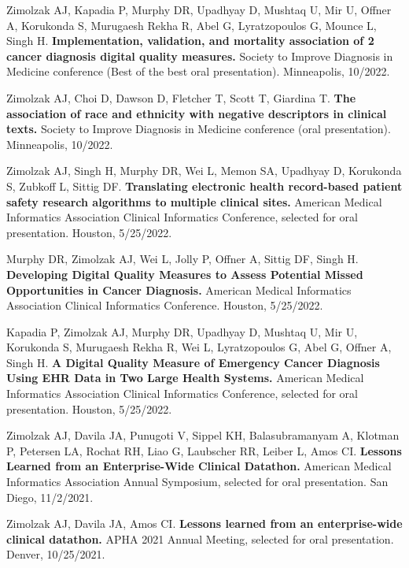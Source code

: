 \documentclass[10pt]{article}
\begin{document}
Zimolzak AJ, Kapadia P, Murphy DR, Upadhyay D, Mushtaq U, Mir U,
Offner A, Korukonda S, Murugaesh Rekha R, Abel G, Lyratzopoulos G,
Mounce L, Singh H. \textbf{Implementation, validation, and mortality
  association of 2 cancer diagnosis digital quality measures.} Society
to Improve Diagnosis in Medicine conference (Best of the best oral
presentation). Minneapolis, 10/2022.

Zimolzak AJ, Choi D, Dawson D, Fletcher T, Scott T, Giardina T.
\textbf{The association of race and ethnicity with negative
  descriptors in clinical texts.} Society to Improve Diagnosis in
Medicine conference (oral presentation). Minneapolis, 10/2022.



Zimolzak AJ, Singh H, Murphy DR, Wei L, Memon SA, Upadhyay D,
Korukonda S, Zubkoff L, Sittig DF. \textbf{Translating electronic
  health record-based patient safety research algorithms to multiple
  clinical sites.} American Medical Informatics Association Clinical
Informatics Conference, selected for oral presentation. Houston,
5/25/2022.

Murphy DR, Zimolzak AJ, Wei L, Jolly P, Offner A, Sittig DF, Singh H.
\textbf{Developing Digital Quality Measures to Assess Potential Missed
  Opportunities in Cancer Diagnosis.} American Medical Informatics
Association Clinical Informatics Conference. Houston, 5/25/2022.

Kapadia P, Zimolzak AJ, Murphy DR, Upadhyay D, Mushtaq U, Mir U,
Korukonda S, Murugaesh Rekha R, Wei L, Lyratzopoulos G, Abel G, Offner
A, Singh H. \textbf{A Digital Quality Measure of Emergency Cancer
  Diagnosis Using EHR Data in Two Large Health Systems.} American
Medical Informatics Association Clinical Informatics Conference,
selected for oral presentation. Houston, 5/25/2022.



Zimolzak AJ, Davila JA, Punugoti V, Sippel KH, Balasubramanyam A,
Klotman P, Petersen LA, Rochat RH, Liao G, Laubscher RR, Leiber L,
Amos CI. \textbf{Lessons Learned from an Enterprise-Wide Clinical
  Datathon.} American Medical Informatics Association Annual
Symposium, selected for oral presentation. San Diego, 11/2/2021.

Zimolzak AJ, Davila JA, Amos CI. \textbf{Lessons learned from an
  enterprise-wide clinical datathon.} APHA 2021 Annual Meeting,
selected for oral presentation. Denver, 10/25/2021.
\end{document}

